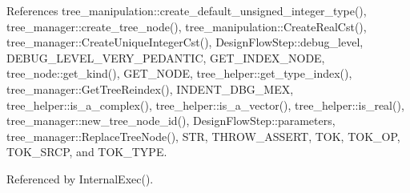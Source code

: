 References tree\+\_\+manipulation\+::create\+\_\+default\+\_\+unsigned\+\_\+integer\+\_\+type(), tree\+\_\+manager\+::create\+\_\+tree\+\_\+node(), tree\+\_\+manipulation\+::\+Create\+Real\+Cst(), tree\+\_\+manager\+::\+Create\+Unique\+Integer\+Cst(), Design\+Flow\+Step\+::debug\+\_\+level, D\+E\+B\+U\+G\+\_\+\+L\+E\+V\+E\+L\+\_\+\+V\+E\+R\+Y\+\_\+\+P\+E\+D\+A\+N\+T\+IC, G\+E\+T\+\_\+\+I\+N\+D\+E\+X\+\_\+\+N\+O\+DE, tree\+\_\+node\+::get\+\_\+kind(), G\+E\+T\+\_\+\+N\+O\+DE, tree\+\_\+helper\+::get\+\_\+type\+\_\+index(), tree\+\_\+manager\+::\+Get\+Tree\+Reindex(), I\+N\+D\+E\+N\+T\+\_\+\+D\+B\+G\+\_\+\+M\+EX, tree\+\_\+helper\+::is\+\_\+a\+\_\+complex(), tree\+\_\+helper\+::is\+\_\+a\+\_\+vector(), tree\+\_\+helper\+::is\+\_\+real(), tree\+\_\+manager\+::new\+\_\+tree\+\_\+node\+\_\+id(), Design\+Flow\+Step\+::parameters, tree\+\_\+manager\+::\+Replace\+Tree\+Node(), S\+TR, T\+H\+R\+O\+W\+\_\+\+A\+S\+S\+E\+RT, T\+OK, T\+O\+K\+\_\+\+OP, T\+O\+K\+\_\+\+S\+R\+CP, and T\+O\+K\+\_\+\+T\+Y\+PE.



Referenced by Internal\+Exec().


